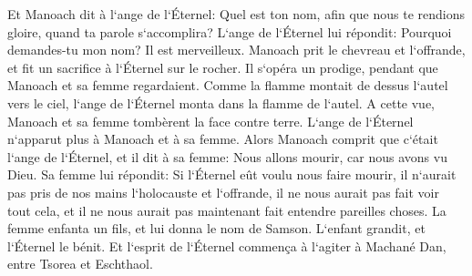 \verse Et Manoach dit à l`ange de l`Éternel: Quel est ton nom, afin que nous te rendions gloire, quand ta parole s`accomplira? 
\verse L`ange de l`Éternel lui répondit: Pourquoi demandes-tu mon nom? Il est merveilleux. 
\verse Manoach prit le chevreau et l`offrande, et fit un sacrifice à l`Éternel sur le rocher. Il s`opéra un prodige, pendant que Manoach et sa femme regardaient. 
\verse Comme la flamme montait de dessus l`autel vers le ciel, l`ange de l`Éternel monta dans la flamme de l`autel. A cette vue, Manoach et sa femme tombèrent la face contre terre. 
\verse L`ange de l`Éternel n`apparut plus à Manoach et à sa femme. Alors Manoach comprit que c`était l`ange de l`Éternel, 
\verse et il dit à sa femme: Nous allons mourir, car nous avons vu Dieu. 
\verse Sa femme lui répondit: Si l`Éternel eût voulu nous faire mourir, il n`aurait pas pris de nos mains l`holocauste et l`offrande, il ne nous aurait pas fait voir tout cela, et il ne nous aurait pas maintenant fait entendre pareilles choses. 
\verse La femme enfanta un fils, et lui donna le nom de Samson. L`enfant grandit, et l`Éternel le bénit. 
\verse Et l`esprit de l`Éternel commença à l`agiter à Machané Dan, entre Tsorea et Eschthaol. 

